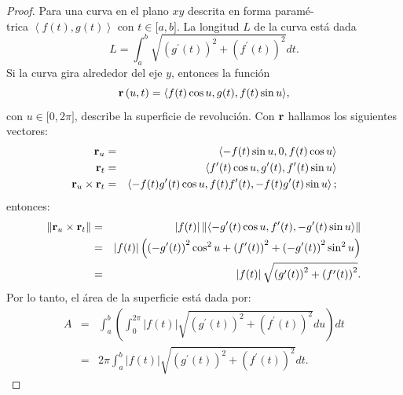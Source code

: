 \begin{proof}
  Para una curva en el plano $xy$ descrita en forma paramé- \\ trica
$\left\langle f(t) ,g(t) \right\rangle$ con $t\in\lbrack a,b]$. La longitud $L$ de la curva está dada
\[L=\int_{a}^{b}\sqrt{\left( g^{\prime }(t)\right) ^{2}+\left( f^{\prime }(t) \right) ^{2}}dt.\]
Si la curva gira alrededor del eje $y$, entonces la función
\[{\bf r}\left(u,t\right) =\left\langle f(t) \cos u,g(t) ,f(t) \sin u\right\rangle\!,\]
con $u\in \lbrack 0,2\pi ]$,
describe la superficie de revolución.
Con ${\bf r}$ hallamos los siguientes vectores:
\begin{eqnarray*}
{\bf r}_{u} &=& \left\langle -f(t) \sin u,0,f(t) \cos u\right\rangle \\
{\bf r}_{t}&=&\left\langle f^{\prime }(t) \cos u,g^{\prime }(t) ,f^{\prime }(t) \sin u\right\rangle \\
{\bf r}_{u}\times {\bf r}_{t}&=& \left\langle-f(t)g^{\prime}(t)\cos u,f(t)f^{\prime}(t),-f(t)g^{\prime}(t)\sin u\right\rangle;
\end{eqnarray*}
entonces:
\begin{eqnarray*}
\left\Vert {\bf r}_{u}\times {\bf r}_{t}\right\Vert &=& \left\vert f(t) \right\vert \left\Vert\left\langle -g^{\prime }(t) \cos u,f^{\prime }(t),-g^{\prime }(t) \sin u\right\rangle \right\Vert\\
&=& \left\vert f(t) \right\vert \left( \left( -g^{\prime }(t)\right) ^{2}\cos ^{2}u+\left( f^{\prime }(t) \right) ^{2}+\left(-g^{\prime }(t) \right) ^{2}\sin ^{2}u\right) \\
&=& \left\vert f(t) \right\vert \sqrt{\left( g^{\prime }(t) \right) ^{2}+\left( f^{\prime }(t) \right) ^{2}}.
\end{eqnarray*}
Por lo tanto, el área de la superficie está dada por:
%
\begin{eqnarray*}
A &=& \int_{a}^{b}\left( \int_{0}^{2\pi }\left\vert f(t)\right\vert \sqrt{\left( g^{\prime }(t) \right) ^{2}+\left(f^{\prime }(t) \right) ^{2}}du\right) dt \\
&=& 2\pi\int_{a}^{b}\left\vert f(t) \right\vert \sqrt{\left( g^{\prime}(t) \right) ^{2}+\left( f^{\prime }(t) \right) ^{2}}dt.
\end{eqnarray*}


\end{proof}
